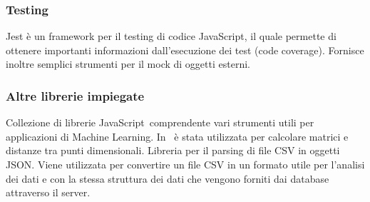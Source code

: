     \subsubsection{Testing}
        Jest è un framework per il testing di codice JavaScript\glo , il quale permette di ottenere importanti informazioni dall'esecuzione dei test (code coverage). Fornisce inoltre semplici strumenti per il mock di oggetti esterni.
    \subsubsection{Altre librerie impiegate}
        Collezione di librerie JavaScript\glo\ comprendente vari strumenti utili per applicazioni di Machine Learning. In \hd\ è stata utilizzata per calcolare matrici e distanze tra punti dimensionali.
        Libreria per il parsing di file CSV in oggetti JSON. Viene utilizzata per convertire un file CSV in un formato utile per l'analisi dei dati e con la stessa struttura dei dati che vengono forniti dai database attraverso il server.
